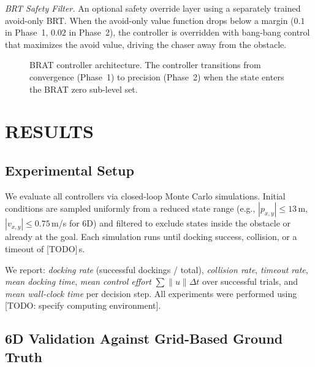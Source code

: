 \documentclass[letterpaper, 10 pt, conference]{ieeeconf}
\begin{document}
\textit{BRT Safety Filter.}
An optional safety override layer using a separately trained avoid-only BRT. When the avoid-only value function drops below a margin ($0.1$ in Phase~1, $0.02$ in Phase~2), the controller is overridden with bang-bang control that maximizes the avoid value, driving the chaser away from the obstacle.

   \begin{figure}[t]
      \centering
      \caption{BRAT controller architecture. The controller transitions from convergence (Phase~1) to precision (Phase~2) when the state enters the BRAT zero sub-level set.}
      \label{fig:controller}
   \end{figure}

\section{RESULTS}

\subsection{Experimental Setup}

We evaluate all controllers via closed-loop Monte Carlo simulations. Initial conditions are sampled uniformly from a reduced state range (e.g., $|p_{x,y}| \leq 13$\,m, $|v_{x,y}| \leq 0.75$\,m/s for 6D) and filtered to exclude states inside the obstacle or already at the goal. Each simulation runs until docking success, collision, or a timeout of [TODO]\,s.

We report: \emph{docking rate} (successful dockings / total), \emph{collision rate}, \emph{timeout rate}, \emph{mean docking time}, \emph{mean control effort} $\sum \|u\| \Delta t$ over successful trials, and \emph{mean wall-clock time} per decision step. All experiments were performed using [TODO: specify computing environment].

\subsection{6D Validation Against Grid-Based Ground Truth}
\end{document}
